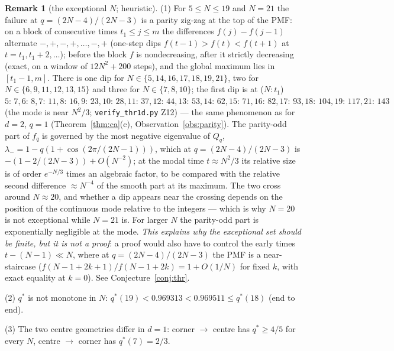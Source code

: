 \documentclass[11pt,a4paper]{article}
\theoremstyle{definition}
\newtheorem{remark}[theorem]{Remark}
\begin{document}
\begin{remark}[the exceptional $N$; heuristic]\label{rem:exceptional}
(1) For $5\le N\le19$ and $N=21$ the failure at $q=(2N-4)/(2N-3)$ is a parity zig-zag at the top of the PMF: on a block of consecutive times $t_1\le j\le m$ the differences $f(j)-f(j-1)$ alternate $-,+,-,+,\dots,-,+$ (one-step dips $f(t-1)>f(t)<f(t+1)$ at $t=t_1,t_1+2,\dots$); before the block $f$ is nondecreasing, after it strictly decreasing (exact, on a window of $12N^2+200$ steps), and the global maximum lies in $[t_1-1,m]$. There is one dip for $N\in\{5,14,16,17,18,19,21\}$, two for $N\in\{6,9,11,12,13,15\}$ and three for $N\in\{7,8,10\}$; the first dip is at ($N\!:t_1$) $5\!:\,7, 6\!:\,8, 7\!:\,11, 8\!:\,16, 9\!:\,23, 10\!:\,28, 11\!:\,37, 12\!:\,44, 13\!:\,53, 14\!:\,62, 15\!:\,71, 16\!:\,82, 17\!:\,93, 18\!:\,104, 19\!:\,117, 21\!:\,143$ (the mode is near $N^2/3$; \texttt{verify\_thr1d.py} Z12)
--- the same phenomenon as for $d=2$, $q=1$ (Theorem~\ref{thm:ca}(c), Observation~\ref{obs:parity}). The parity-odd part of $f_q$ is governed by the most negative eigenvalue of $Q_q$, $\lambda_-=1-q(1+\cos(2\pi/(2N-1)))$, which at $q=(2N-4)/(2N-3)$ is $-(1-2/(2N-3))+O(N^{-2})$; at the modal time $t\approx N^2/3$ its relative size is of order $e^{-N/3}$ times an algebraic factor, to be compared with the relative second difference $\approx N^{-4}$ of the smooth part at its maximum. The two cross around $N\approx20$, and whether a dip appears near the crossing depends on the position of the continuous mode relative to the integers --- which is why $N=20$ is not exceptional while $N=21$ is. For larger $N$ the parity-odd part is exponentially negligible at the mode. \emph{This explains why the exceptional set should be finite, but it is not a proof}: a proof would also have to control the early times $t-(N-1)\ll N$, where at $q=(2N-4)/(2N-3)$ the PMF is a near-staircase ($f(N-1+2k+1)/f(N-1+2k)=1+O(1/N)$ for fixed $k$, with exact equality at $k=0$). See Conjecture~\ref{conj:thr}.

(2) $q^*$ is not monotone in $N$: $q^*(19)<0.969313<0.969511\le q^*(18)$ (end to end).

(3) The two centre geometries differ in $d=1$: corner $\to$ centre has $q^*\ge4/5$ for every $N$, centre $\to$ corner has $q^*(7)=2/3$.
\end{remark}
\end{document}
